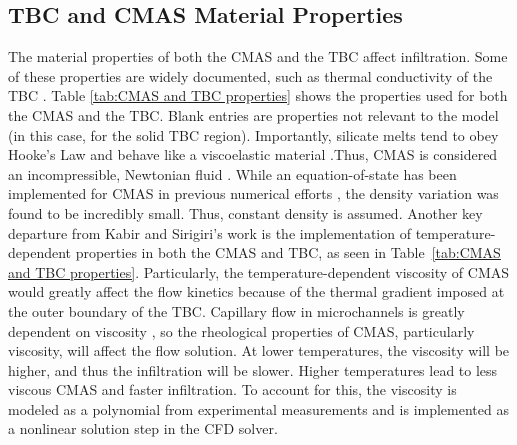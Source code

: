 \documentclass[%
 aip,
 amsmath,amssymb,
 reprint,%
]{revtex4-1}
\begin{document}
\subsection{TBC and CMAS Material Properties}
\label{subsec:CMAS/TBCProp}
The material properties of both the CMAS and the TBC affect infiltration. Some of these properties are widely documented, such as thermal conductivity of the TBC \cite{Han2023}. Table \ref{tab:CMAS and TBC properties} shows the properties used for both the CMAS and the TBC. Blank entries are properties not relevant to the model (in this case, for the solid TBC region). Importantly, silicate melts tend to obey Hooke's Law and behave like a viscoelastic material \cite{Sharon1997}.Thus, CMAS is considered an incompressible, Newtonian fluid \cite{Naraparaju2017,Naraparaju2019, Sharon1997}.  While an equation-of-state has been implemented for CMAS in previous numerical efforts \cite{Sirigiri2018}, the density variation was found to be incredibly small. Thus, constant density is assumed. 
Another key departure from Kabir and Sirigiri's work \cite{Kabir, Sirigiri2018} is the implementation of temperature-dependent properties in both the CMAS and TBC, as seen in Table~\ref{tab:CMAS and TBC properties}. Particularly, the temperature-dependent viscosity of CMAS would greatly affect the flow kinetics because of the thermal gradient imposed at the outer boundary of the TBC. Capillary flow in microchannels is greatly dependent on viscosity \cite{Washburn19213}, so the rheological properties of CMAS, particularly viscosity, will affect the flow solution. At lower temperatures, the viscosity will be higher, and thus the infiltration will be slower. Higher temperatures lead to less viscous CMAS and faster infiltration. To account for this, the viscosity is modeled as a polynomial from experimental measurements \cite{Naraparaju2019} and is implemented as a nonlinear solution step in the CFD solver.
\end{document}
